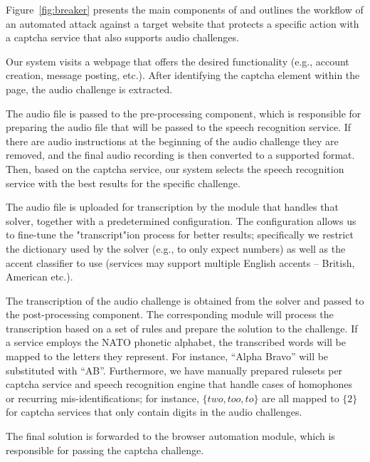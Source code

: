 Figure~\ref{fig:breaker} presents the main components of \system and outlines the workflow of
an automated attack against a target website that protects a specific action with a captcha 
service that also supports audio challenges.

\protect{} Our system visits a webpage that offers the desired functionality 
(e.g., account creation, message posting, etc.). After identifying the captcha element within 
the page, the audio challenge is extracted.

\protect{} The audio file is passed to the pre-processing component, which is responsible 
for preparing the audio file that will be passed to the speech recognition service. If there are audio 
instructions at the beginning of the audio challenge they are removed, and the final audio
recording is then converted to a supported format. Then, based on the captcha service, our system
selects the speech recognition service with the best results for the specific challenge.

\protect{} The audio file is uploaded for transcription by the module that handles that solver, 
together with a predetermined configuration. The configuration allows us to fine-tune the "transcript"ion process
for better results; specifically we restrict the dictionary used by the solver (e.g., to only expect  
numbers) as well as the accent classifier to use (services may support multiple English accents 
-- British, American etc.).

\protect{} The transcription of the audio challenge is obtained from the solver 
and passed to the post-processing component. The corresponding module will process the transcription 
based on a set of rules %
and prepare the solution to the challenge. If a service employs the 
NATO phonetic alphabet, the transcribed words will be mapped to the letters they represent. For instance, 
``Alpha Bravo'' will be substituted with ``AB''. Furthermore, we have manually prepared rulesets
per captcha service and speech recognition engine %
that handle cases of homophones or recurring mis-identifications; for instance, $\{two,too,to\}$ are all
mapped to $\{2\}$ for captcha services that only contain digits in the audio challenges.

\protect{} The final solution is forwarded to the browser automation module,
which is responsible for passing the captcha challenge.

